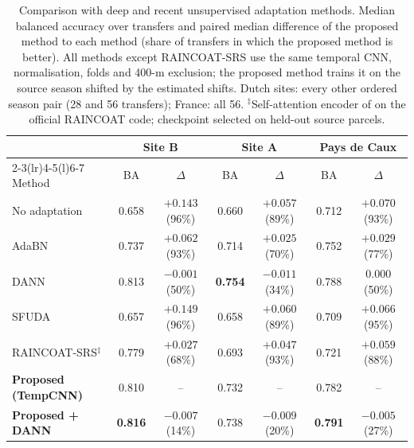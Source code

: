 \begin{table}[!t]
\caption{Comparison with deep and recent unsupervised adaptation methods. Median balanced accuracy over transfers and paired median
difference of the proposed method to each method (share of transfers in which the proposed method is better). All methods except
RAINCOAT-SRS use the same temporal CNN, normalisation, folds and 400-m exclusion; the proposed method trains it on the source season
shifted by the estimated shifts. Dutch sites: every other ordered season pair (28 and 56 transfers); France: all 56.
$^{\ddagger}$Self-attention encoder of \cite{Gackstetter2025} on the official RAINCOAT code; checkpoint selected on held-out source parcels.}
\label{tab:sota}
\centering\footnotesize
\begin{tabular}{@{}lcccccc@{}}
\toprule
 & \multicolumn{2}{c}{Site B} & \multicolumn{2}{c}{Site A} & \multicolumn{2}{c}{Pays de Caux}\\
\cmidrule(lr){2-3}\cmidrule(lr){4-5}\cmidrule(l){6-7}
Method & BA & $\Delta$ & BA & $\Delta$ & BA & $\Delta$\\
\midrule
No adaptation & 0.658 & $+0.143$ (96\%) & 0.660 & $+0.057$ (89\%) & 0.712 & $+0.070$ (93\%)\\
AdaBN \cite{Li2018adabn} & 0.737 & $+0.062$ (93\%) & 0.714 & $+0.025$ (70\%) & 0.752 & $+0.029$ (77\%)\\
DANN \cite{Ganin2016} & 0.813 & $-0.001$ (50\%) & \textbf{0.754} & $-0.011$ (34\%) & 0.788 & $0.000$ (50\%)\\
SFUDA \cite{Mohammadi2024} & 0.657 & $+0.149$ (96\%) & 0.658 & $+0.060$ (89\%) & 0.709 & $+0.066$ (95\%)\\
RAINCOAT-SRS$^{\ddagger}$ \cite{Gackstetter2025} & 0.779 & $+0.027$ (68\%) & 0.693 & $+0.047$ (93\%) & 0.721 & $+0.059$ (88\%)\\
\midrule
\textbf{Proposed (TempCNN)} & 0.810 & -- & 0.732 & -- & 0.782 & --\\
\textbf{Proposed + DANN} & \textbf{0.816} & $-0.007$ (14\%) & 0.738 & $-0.009$ (20\%) & \textbf{0.791} & $-0.005$ (27\%)\\
\bottomrule
\end{tabular}
\end{table}
